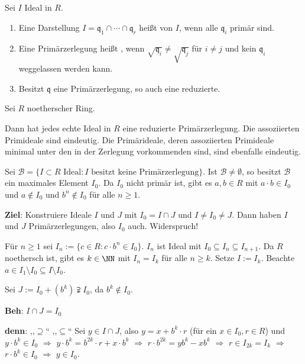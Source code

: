 \begin{Def}
Sei $I$ Ideal in $R$.

\begin{enumerate}
\item Eine Darstellung $I = \mathfrak{q}_1 \cap \cdots \cap \mathfrak{q}_r$ heißt  von $I$, wenn alle $\mathfrak{q}_i$ primär sind.

\item Eine Primärzerlegung heißt , wenn $\sqrt{\mathfrak{q}_i} \neq \sqrt{\mathfrak{q}_j}$ für $i \neq j$ und kein $\mathfrak{q}_i$ weggelassen werden kann.

\item Besitzt $\mathfrak{q}$ eine Primärzerlegung, so auch eine reduzierte.
\end{enumerate}
\end{Def}

\begin{Satz}
Sei $R$ noetherscher Ring.

Dann hat jedes echte Ideal in $R$ eine reduzierte Primärzerlegung. Die assoziierten Primideale sind eindeutig. Die Primärideale, deren assoziierten Primideale minimal unter den in der Zerlegung vorkommenden sind, sind ebenfalls eindeutig.

\begin{Bew}
Sei $\mathcal{B} = \{ I \subset R \text{ Ideal} : I \text{ besitzt keine Primärzerlegung} \}$. Ist $\mathcal{B} \neq \emptyset$, so besitzt $\mathcal{B}$ ein maximales Element $I_0$. Da $I_0$ nicht primär ist, gibt es $a,b \in R$ mit $a \cdot b \in I_0$ und $a \notin I_0$ und $b^n \notin I_0$ für alle $n \geq 1$.

\textbf{Ziel}: Konstruiere Ideale $I$ und $J$ mit $I_0 = I \cap J$ und $I \neq I_0 \neq J$. Dann haben $I$ und $J$ Primärzerlegungen, also $I_0$ auch. Widerspruch!

Für $n \geq 1$ sei $I_n := \{ c \in R : c \cdot b^n \in I_0 \}$. $I_n$ ist Ideal mit $I_0 \subseteq I_n \subseteq I_{n+1}$. Da $R$ noethersch ist, gibt es $k \in \NN$ mit $I_n = I_k$ für alle $n \geq k$. Setze $I := I_k$. Beachte $a \in I_1 \setminus I_0 \subseteq I \setminus I_0$.

Sei $J := I_0 + (b^k) \supsetneqq I_0$, da $b^k \notin I_0$.

\textbf{Beh}: $I \cap J = I_0$

\textbf{denn}: ,,$\supseteq$`` \chk ,,$\subseteq$`` Sei $y \in I \cap J$, also $y = x + b^k \cdot r$ (für ein $x \in I_0, r \in R$) und $y \cdot b^k \in I_0$ $\Rightarrow$ $y \cdot b^k = b^{2k} \cdot r + x \cdot b^k$ $\Rightarrow$ $r \cdot b^{2k} = y b^k-x b^k$ $\Rightarrow$ $r \in I_{2k} = I_k$ $\Rightarrow$ $r \cdot b^k \in I_0$ $\Rightarrow$ $y \in I_0$.

\end{Bew}
\end{Satz}
